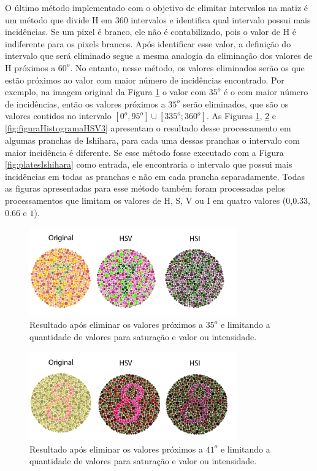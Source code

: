 \documentclass[	12pt, Times, openright, twoside, a4paper, english, brazil]{abntex2}
\begin{document}
O último método implementado com o objetivo de elimitar intervalos na matiz é um método que divide H em 360 intervalos e identifica qual intervalo possui mais incidências. Se um pixel é branco, ele não é contabilizado, pois o valor de H é indiferente para os pixels brancos. Após identificar esse valor, a definição do intervalo que será eliminado segue a mesma analogia da eliminação dos valores de H próximos a $60^o$. No entanto, nesse método, os valores eliminados serão os que estão próximos ao valor com maior número de incidências encontrado. Por exemplo, na imagem original da Figura \ref{fig:figuraHistogramaHSV} o valor com $35^o$ é o com maior número de incidências, então os valores próximos a $35^o$ serão eliminados, que são os valores contidos no intervalo $[0^o,95^o] \cup [335^o;360^o]$. As Figuras \ref{fig:figuraHistogramaHSV}, \ref{fig:figuraHistogramaHSV2} e \ref{fig:figuraHistogramaHSV3} apresentam o resultado desse processamento em algumas pranchas de Ishihara, para cada uma dessas pranchas o intervalo com maior incidência é diferente. Se esse método fosse executado com a Figura \ref{fig:platesIshihara} como entrada, ele encontraria o intervalo que possui mais incidências em todas as pranchas e não em cada prancha separadamente. Todas as figuras apresentadas para esse método também foram processadas pelos processamentos que limitam os valores de H, S, V ou I em quatro valores ($0$,$0.33$,$0.66$ e $1$).


\begin{figure}[!htb]
\centering \includegraphics[width=0.8\textwidth]{figuraHistograma.png}
\caption{Resultado após eliminar os valores próximos a $35^o$ e limitando a quantidade de valores para saturação e valor ou intensidade.}  \label{fig:figuraHistogramaHSV}
\end{figure}

\begin{figure}[!htb]
\centering \includegraphics[width=0.8\textwidth]{figuraHistograma2.png}
\caption{Resultado após eliminar os valores próximos a $41^o$ e limitando a quantidade de valores para saturação e valor ou intensidade.} \label{fig:figuraHistogramaHSV2}
\end{figure}
\end{document}
